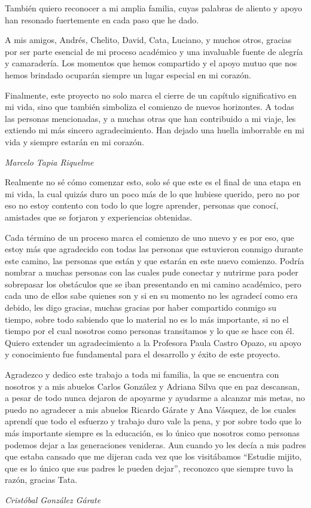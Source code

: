 También quiero reconocer a mi amplia familia, cuyas palabras de aliento y apoyo han resonado fuertemente en cada paso que he dado.

A mis amigos, Andrés, Chelito, David, Cata, Luciano, y muchos otros, gracias por ser parte esencial de mi proceso académico y una invaluable fuente de alegría y camaradería. Los momentos que hemos compartido y el apoyo mutuo que nos hemos brindado ocuparán siempre un lugar especial en mi corazón.

Finalmente, este proyecto no solo marca el cierre de un capítulo significativo en mi vida, sino que también simboliza el comienzo de nuevos horizontes. A todas las personas mencionadas, y a muchas otras que han contribuido a mi viaje, les extiendo mi más sincero agradecimiento. Han dejado una huella imborrable en mi vida y siempre estarán en mi corazón.

\textit{Marcelo Tapia Riquelme}

\newpage
Realmente no sé cómo comenzar esto, solo sé que este es el final de una etapa en mi vida, la cual quizás duro un poco más de lo que hubiese querido, pero no por eso no estoy contento con todo lo que logre aprender, personas que conocí, amistades que se forjaron y experiencias obtenidas.

Cada término de un proceso marca el comienzo de uno nuevo y es por eso, que estoy más que agradecido con todas las personas que estuvieron conmigo durante este camino, las personas que están y que estarán en este nuevo comienzo. Podría nombrar a muchas personas con las cuales pude conectar y nutrirme para poder sobrepasar los obstáculos que se iban presentando en mi camino académico, pero cada uno de ellos sabe quienes son y si en su momento no les agradecí como era debido, les digo gracias, muchas gracias por haber compartido conmigo su tiempo, sobre todo sabiendo que lo material no es lo más importante, si no el tiempo por el cual nosotros como personas transitamos y lo que se hace con él. Quiero extender un agradecimiento a la Profesora Paula Castro Opazo, su apoyo y conocimiento fue fundamental para el desarrollo y éxito de este proyecto.

Agradezco y dedico este trabajo a toda mi familia, la que se encuentra con nosotros y a mis abuelos Carlos González y Adriana Silva que en paz descansan, a pesar de todo nunca dejaron de apoyarme y ayudarme a alcanzar mis metas, no puedo no agradecer a mis abuelos Ricardo Gárate y Ana Vásquez, de los cuales aprendí que todo el esfuerzo y trabajo duro vale la pena, y por sobre todo que lo más importante siempre es la educación, es lo único que nosotros como personas podemos dejar a las generaciones venideras. Aun cuando yo les decía a mis padres que estaba cansado que me dijeran cada vez que los visitábamos “Estudie mijito, que es lo único que sus padres le pueden dejar”, reconozco que siempre tuvo la razón, gracias Tata.

\textit{Cristóbal González Gárate}